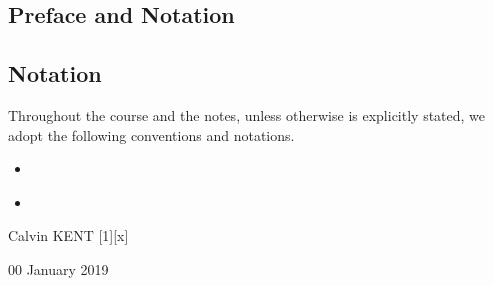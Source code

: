 \documentclass[11pt,oneside]{book} %
\begin{document}
	\renewcommand*{\term}{Term 2000} %
	\renewcommand*{\coursecode}{MATH 000} %
	\renewcommand*{\coursename}{Course Name} %
	\renewcommand*{\profname}{Prof Name} %
	\renewcommand*{\colink}{http://www.student.math.uwaterloo.ca/~c2kent} %
	\inserttoctitle
	\pagestyle{plain}
	\section*{Preface and Notation}
	\ckpreface
	\section*{Notation}
	Throughout the course and the notes, unless otherwise is explicitly stated, we adopt the following conventions and notations.
	\begin{itemize}
		\item ~
		\item ~
	\end{itemize}
	\hfill Calvin KENT
	\clearpage
	\setfigpath
	\pagestyle{classlecture}
[1][x]
\begin{lec}{00 January 2019}
	\chapter{\chapname\chaplec}
\end{lec}
\end{document}
